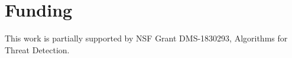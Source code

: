 \documentclass[11pt]{article}
\theoremstyle{definition}
\begin{document}
% 

\section*{Funding}

This work is partially supported by NSF Grant DMS-1830293, Algorithms for Threat Detection.


%
%
%
%
%
%
%
%
%
\end{document}
